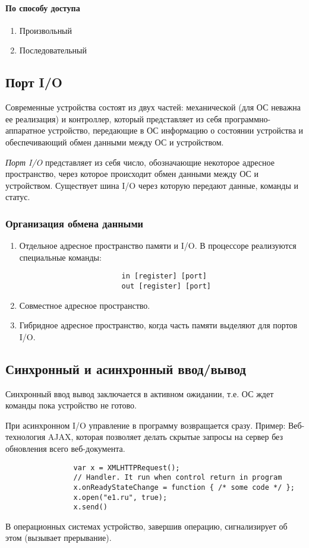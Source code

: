 \documentclass[]{article}
\begin{document}
			\paragraph{По способу доступа}
			\begin{enumerate}
				\item Произвольный
				\item Последовательный
			\end{enumerate}
			
			\subsection{Порт I/O}
			Современные устройства состоят из двух частей: механической (для ОС неважна ее реализация) и контроллер, который представляет из себя программно-аппаратное устройство, передающие в ОС информацию о состоянии устройства и обеспечивающий обмен данными между ОС и устройством.
			
			\textit{Порт I/O} представляет из себя число, обозначающие некоторое адресное пространство, через которое происходит обмен данными между ОС и устройством. Существует шина I/O через которую передают данные, команды и статус. 
			
				\subsubsection{Организация обмена данными}
				\begin{enumerate}
					\item Отдельное адресное пространство памяти и I/O. В процессоре реализуются специальные команды: \begin{lstlisting}
						in [register] [port]
						out [register] [port]
					\end{lstlisting}
				\item Совместное адресное пространство.
				\item Гибридное адресное пространство, когда часть памяти выделяют для портов I/O.
				\end{enumerate}
			
			\subsection{Синхронный и асинхронный ввод/вывод}
			Синхронный ввод вывод заключается в активном ожидании, т.е. ОС ждет команды пока устройство не готово.
			
			При асинхронном I/O управление в программу возвращается сразу. Пример: Веб-технология AJAX, которая позволяет делать скрытые запросы на сервер без обновления всего веб-документа.
			\begin{lstlisting}
				var x = XMLHTTPRequest();
				// Handler. It run when control return in program
				x.onReadyStateChange = function { /* some code */ };
				x.open("e1.ru", true);
				x.send()
			\end{lstlisting}
			В операционных системах устройство, завершив операцию, сигнализирует об этом (вызывает прерывание).
\end{document}
